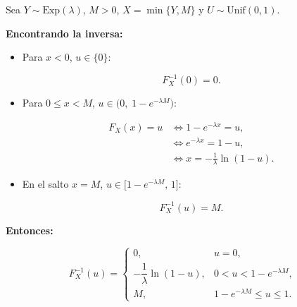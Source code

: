 \documentclass[10pt,a4paper]{article}
\begin{document}
    Sea \(Y\sim\mathrm{Exp}(\lambda)\), \(M>0\), \(X=\min\{Y,M\}\) y
\(U\sim\mathrm{Unif}(0,1)\). 

\textbf{Encontrando la inversa:}

\begin{itemize}
\item
  Para \(x<0\), \(u\in\{0\}\):

  \[
  F_X^{-1}(0)=0.
  \]
\item
  Para \(0\leq x<M\), \(u\in\big(0,\;1-e^{-\lambda M}\big)\):

  \[
  \begin{aligned}
  F_X(x)=u 
  &\iff 1-e^{-\lambda x}=u,\\
  &\iff e^{-\lambda x}=1-u,\\
  &\iff x=-\frac{1}{\lambda}\ln(1-u).
  \end{aligned}
  \]
\item
  En el salto \(x=M\), \(u\in\big[1-e^{-\lambda M},\,1\big]\):

  \[
  F_X^{-1}(u)=M.
  \]
\end{itemize}

\textbf{Entonces:}

\[
F_X^{-1}(u)=
\begin{cases}
0, & u=0,\\[6pt]
-\dfrac{1}{\lambda}\ln(1-u), & 0<u<1-e^{-\lambda M},\\[10pt]
M, & 1-e^{-\lambda M}\leq u\leq 1.
\end{cases}
\]
\end{document}
